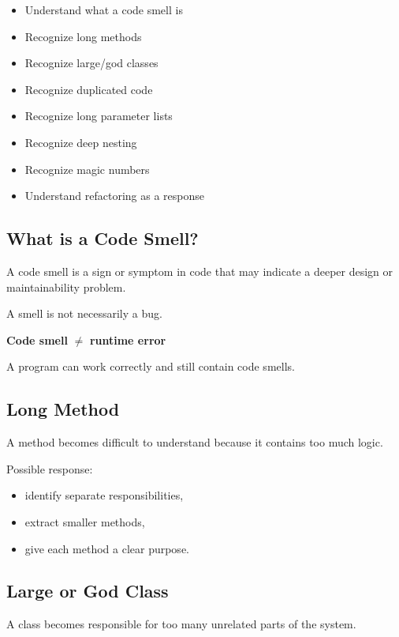 \documentclass[11pt,a4paper]{article}
\newcommand{\checkitem}{$\square$}
\begin{document}
\begin{itemize}[label=\checkitem]
    \item Understand what a code smell is
    \item Recognize long methods
    \item Recognize large/god classes
    \item Recognize duplicated code
    \item Recognize long parameter lists
    \item Recognize deep nesting
    \item Recognize magic numbers
    \item Understand refactoring as a response
\end{itemize}

\subsection{What is a Code Smell?}

A code smell is a sign or symptom in code that may indicate a deeper design
or maintainability problem.

A smell is not necessarily a bug.

\begin{center}
\textbf{Code smell} $\neq$ \textbf{runtime error}
\end{center}

A program can work correctly and still contain code smells.

\subsection{Long Method}

A method becomes difficult to understand because it contains too much logic.

Possible response:

\begin{itemize}
    \item identify separate responsibilities,
    \item extract smaller methods,
    \item give each method a clear purpose.
\end{itemize}

\subsection{Large or God Class}

A class becomes responsible for too many unrelated parts of the system.
\end{document}

